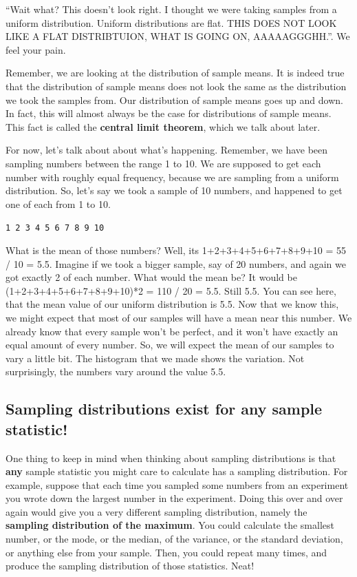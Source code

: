 \documentclass[
]{book}
\begin{document}
``Wait what? This doesn't look right. I thought we were taking samples from a uniform distribution. Uniform distributions are flat. THIS DOES NOT LOOK LIKE A FLAT DISTRIBTUION, WHAT IS GOING ON, AAAAAGGGHH.''. We feel your pain.

Remember, we are looking at the distribution of sample means. It is indeed true that the distribution of sample means does not look the same as the distribution we took the samples from. Our distribution of sample means goes up and down. In fact, this will almost always be the case for distributions of sample means. This fact is called the \textbf{central limit theorem}, which we talk about later.

For now, let's talk about about what's happening. Remember, we have been sampling numbers between the range 1 to 10. We are supposed to get each number with roughly equal frequency, because we are sampling from a uniform distribution. So, let's say we took a sample of 10 numbers, and happened to get one of each from 1 to 10.

\texttt{1\ 2\ 3\ 4\ 5\ 6\ 7\ 8\ 9\ 10}

What is the mean of those numbers? Well, its 1+2+3+4+5+6+7+8+9+10 = 55 / 10 = 5.5. Imagine if we took a bigger sample, say of 20 numbers, and again we got exactly 2 of each number. What would the mean be? It would be (1+2+3+4+5+6+7+8+9+10)*2 = 110 / 20 = 5.5. Still 5.5. You can see here, that the mean value of our uniform distribution is 5.5. Now that we know this, we might expect that most of our samples will have a mean near this number. We already know that every sample won't be perfect, and it won't have exactly an equal amount of every number. So, we will expect the mean of our samples to vary a little bit. The histogram that we made shows the variation. Not surprisingly, the numbers vary around the value 5.5.

\subsection{Sampling distributions exist for any sample statistic!}\label{sampling-distributions-exist-for-any-sample-statistic}

One thing to keep in mind when thinking about sampling distributions is that \textbf{any} sample statistic you might care to calculate has a sampling distribution. For example, suppose that each time you sampled some numbers from an experiment you wrote down the largest number in the experiment. Doing this over and over again would give you a very different sampling distribution, namely the \textbf{sampling distribution of the maximum}. You could calculate the smallest number, or the mode, or the median, of the variance, or the standard deviation, or anything else from your sample. Then, you could repeat many times, and produce the sampling distribution of those statistics. Neat!
\end{document}
